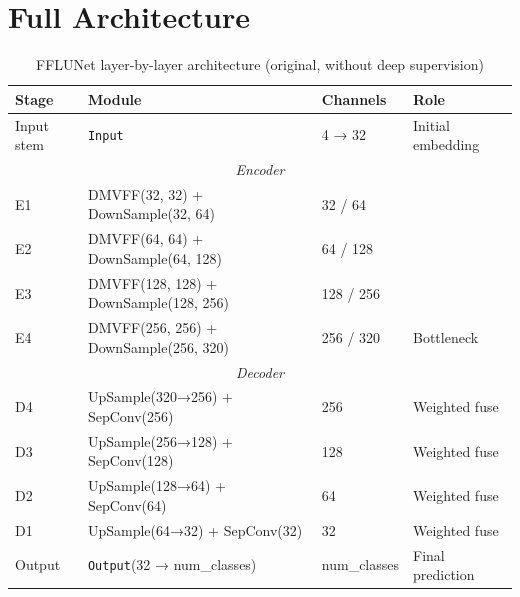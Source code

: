 \documentclass[12pt,a4paper]{report}
\begin{document}
\section{Full Architecture}

\begin{table}[H]
\centering
\caption{FFLUNet layer-by-layer architecture (original, without deep supervision)}
\label{tab:fflunet_arch}
\begin{tabular}{llll}
\toprule
\textbf{Stage} & \textbf{Module} & \textbf{Channels} & \textbf{Role} \\
\midrule
Input stem & \texttt{Input} & 4 → 32 & Initial embedding \\
\midrule
\multicolumn{4}{c}{\textit{Encoder}} \\
\midrule
E1 & DMVFF(32, 32) + DownSample(32, 64) & 32 / 64 & \\
E2 & DMVFF(64, 64) + DownSample(64, 128) & 64 / 128 & \\
E3 & DMVFF(128, 128) + DownSample(128, 256) & 128 / 256 & \\
E4 & DMVFF(256, 256) + DownSample(256, 320) & 256 / 320 & Bottleneck \\
\midrule
\multicolumn{4}{c}{\textit{Decoder}} \\
\midrule
D4 & UpSample(320→256) + SepConv(256) & 256 & Weighted fuse \\
D3 & UpSample(256→128) + SepConv(128) & 128 & Weighted fuse \\
D2 & UpSample(128→64) + SepConv(64) & 64 & Weighted fuse \\
D1 & UpSample(64→32) + SepConv(32) & 32 & Weighted fuse \\
\midrule
Output & \texttt{Output}(32 → num\_classes) & num\_classes & Final prediction \\
\bottomrule
\end{tabular}
\end{table}
\end{document}
